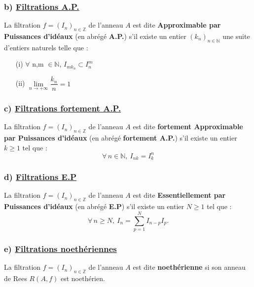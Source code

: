 \subsubsection{b) \underline{Filtrations A.P.}}
\begin{madefinition}
	La filtration $f = (I_n)_{n \in \mathbb{Z}}$ de l'anneau $A$ est dite \textbf{Approximable par Puissances d'idéaux} (en abrégé \textbf{A.P.}) s'il existe un entier $(k_{n})_{n \in \mathbb{N}}$ une suite d'entiers naturels telle que :
	\begin{enumerate}
		\item[(i)] $\forall$ n,m $\in \mathbb{N}$, $I_{mk_n} \subset I_n^{m}$
		\item[(ii)] $\underset{n\longrightarrow +\infty }{\lim }\dfrac{k_{n}}{n}=1$
	\end{enumerate}
\end{madefinition}
\subsubsection{c) \underline{Filtrations fortement A.P.}}
\begin{madefinition}
	La filtration $f = (I_n)_{n \in \mathbb{Z}}$ de l'anneau $A$ est dite \textbf{fortement Approximable par Puissances d'idéaux} (en abrégé \textbf{fortement A.P.}) s'il existe un entier $k \geqslant 1$ tel que :
	\[ \forall \, n \in \mathbb{N}, \ I_{nk} = I_k^n \]
\end{madefinition}
\subsubsection{d) \underline{Filtrations E.P}}
\begin{madefinition}
	La filtration $f = (I_n)_{n \in \mathbb{Z}}$ de l'anneau $A$ est dite \textbf{Essentiellement par Puissances d'idéaux} (en abrégé \textbf{E.P}) s'il existe un entier $N \geqslant 1$ tel que :
	\[ \forall \, n \geqslant N, \ I_n =\sum_{p=1}^{N} I_{n-p}I_p. \]
\end{madefinition}
\subsubsection{e) \underline{Filtrations noethériennes}}
\begin{madefinition}
	La filtration $f = (I_n)_{n \in \mathbb{Z}}$ de l'anneau $A$ est dite \textbf{noethérienne} si son anneau de Rees ${R}(A,f)$ est noethérien.
\end{madefinition}
